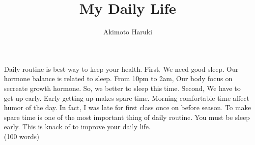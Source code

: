 \documentclass{article}
\title{My Daily Life}
\author{Akimoto Haruki}
\begin{document}
  \maketitle
  Daily routine is best way to keep your health. First, We need good sleep. Our hormone balance is related to sleep. From 10pm to 2am, Our body focus on secreate growth hormone. So, we better to sleep this time. Second, We have to get up early. Early getting up makes spare time. Morning comfortable time affect humor of the day. In fact, I was late for first class once on before season. To make spare time is one of the most important thing of daily routine. You must be sleep early. This is knack of to improve your daily life.
  \\(100 words)
\end{document}
